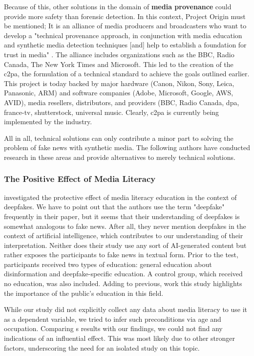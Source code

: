 \documentclass[
  a4paper,  %
  twoside,  %
  bibliography=totoc,
  headsepline,
  cleardoublepage=empty,
  parskip=half,
  draft=false
]{scrbook}
\begin{document}
Because of this, other solutions in the domain of \textbf{media provenance} could provide more safety than forensic detection. In this context, Project Origin must be mentioned; It is an alliance of media producers and broadcasters who want to develop a "technical provenance approach, in conjunction with media education and synthetic media detection techniques [and] help to establish a foundation for trust in media" \cite{ProjectOrigin}. The alliance includes organizations such as the BBC, Radio Canada, The New York Times and Microsoft. This led to the creation of the \gls{c2pa}, the formulation of a technical standard to achieve the goals outlined earlier. This project is today backed by major hardware (Canon, Nikon, Sony, Leica, Panasonic, ARM) and software companies (Adobe, Microsoft, Google, AWS, AVID), media resellers, distributors, and providers (BBC, Radio Canada, dpa, france-tv, shutterstock, universal music. Clearly, \gls{c2pa} is currently being implemented by the industry.

All in all, technical solutions can only contribute a minor part to solving the problem of fake news with synthetic media. The following authors have conducted research in these areas and provide alternatives to merely technical solutions. 

\subsubsection*{The Positive Effect of Media Literacy}
\citeauthor{hwangEffectsDisinformationUsing2021} investigated the protective effect of media literacy education in the context of deepfakes. We have to point out that the authors use the term "deepfake" frequently in their paper, but it seems that their understanding of deepfakes is somewhat analogous to fake news. After all, they never mention deepfakes in the context of artificial intelligence, which contributes to our understanding of their interpretation. Neither does their study use any sort of AI-generated content but rather exposes the participants to fake news in textual form. Prior to the test, participants received two types of education: general education about disinformation and deepfake-specific education. A control group, which received no education, was also included. Adding to previous, work this study highlights the importance of the public's education in this field.

While our study did not explicitly collect any data about media literacy to use it as a dependent variable, we tried to infer such preconditions via age and occupation. Comparing \citeauthor{hwangEffectsDisinformationUsing2021}s results with our findings, we could not find any indications of an influential effect. This was most likely due to other stronger factors, underscoring the need for an isolated study on this topic.
\end{document}
